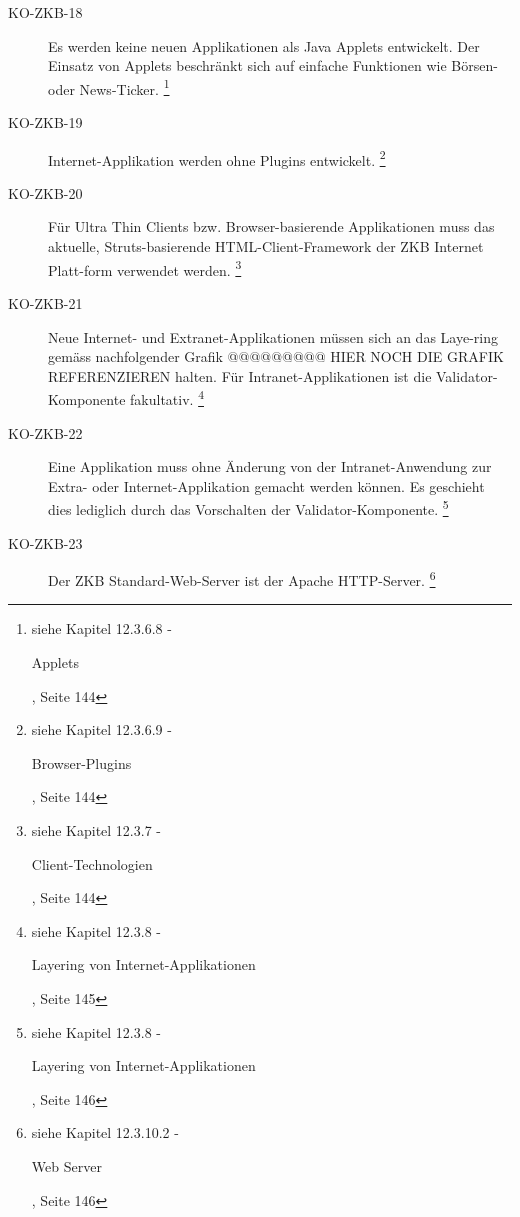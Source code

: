 \documentclass[abstracton, listof=totocnumbered,
bibliography=totocnumbered]{scrreprt}
\begin{document}
\begin{description}
    \item[KO-ZKB-18] Es werden keine neuen Applikationen als Java Applets
    entwickelt. Der Einsatz von Applets beschränkt sich auf einfache Funktionen wie Börsen-
    oder News-Ticker.
    \footnote{siehe Kapitel 12.3.6.8 -
    \begin{itshape}Applets\end{itshape}, Seite 144}
    
    \item[KO-ZKB-19] Internet-Applikation werden ohne Plugins entwickelt.
    \footnote{siehe Kapitel 12.3.6.9 -
    \begin{itshape}Browser-Plugins\end{itshape}, Seite 144}
    
    \item[KO-ZKB-20] Für Ultra Thin Clients bzw. Browser-basierende
    Applikationen muss das aktuelle, Struts-basierende HTML-Client-Framework der ZKB Internet
    Platt-form verwendet werden.
    \footnote{siehe Kapitel 12.3.7 -
    \begin{itshape}Client-Technologien\end{itshape}, Seite 144}
    
    \item[KO-ZKB-21] Neue Internet- und Extranet-Applikationen müssen sich an
    das Laye-ring gemäss nachfolgender Grafik @@@@@@@@@ HIER NOCH DIE GRAFIK
    REFERENZIEREN halten. Für Intranet-Applikationen ist die
    Validator-Komponente fakultativ.
    \footnote{siehe Kapitel 12.3.8 -
    \begin{itshape}Layering von Internet-Applikationen\end{itshape}, Seite 145}
    
    \item[KO-ZKB-22] Eine Applikation muss ohne Änderung von der
    Intranet-Anwendung zur Extra- oder Internet-Applikation gemacht werden können. Es geschieht
    dies lediglich durch das Vorschalten der Validator-Komponente.
    \footnote{siehe Kapitel 12.3.8 -
    \begin{itshape}Layering von Internet-Applikationen\end{itshape}, Seite 146}
    
    \item[KO-ZKB-23] Der ZKB Standard-Web-Server ist der Apache HTTP-Server.
    \footnote{siehe Kapitel 12.3.10.2 -
    \begin{itshape}Web Server\end{itshape}, Seite 146}
    

\end{description}
\end{document}
